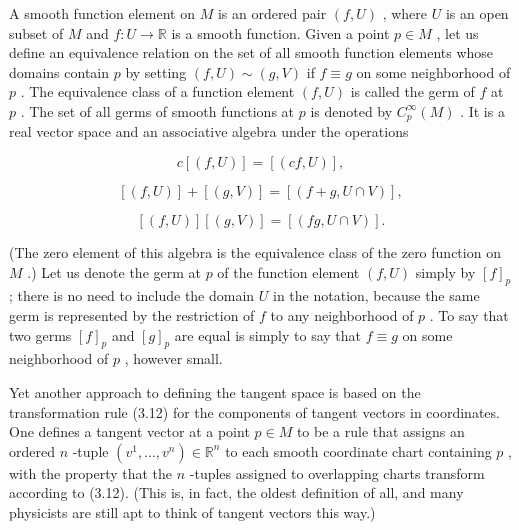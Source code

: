 \begin{definition}
\label{def:3-18-extra-1}
\mathlibok
A smooth function element on $M$ is an ordered pair $\left( {f, U}\right)$ , where $U$ is an open subset of $M$ and $f : U \rightarrow  \mathbb{R}$ is a smooth function. Given a point $p \in  M$ , let us define an equivalence relation on the set of all smooth function elements whose domains contain $p$ by setting $\left( {f, U}\right)  \sim  \left( {g, V}\right)$ if $f \equiv  g$ on some neighborhood of $p$ . The equivalence class of a function element $\left( {f, U}\right)$ is called the germ of $f$ at $p$ . The set of all germs of smooth functions at $p$ is denoted by ${C}_{p}^{\infty }\left( M\right)$ . It is a real vector space and an associative algebra under the operations

\[
c\left\lbrack  \left( {f, U}\right) \right\rbrack   = \left\lbrack  \left( {{cf}, U}\right) \right\rbrack  ,
\]

\[
\left\lbrack  \left( {f, U}\right) \right\rbrack   + \left\lbrack  \left( {g, V}\right) \right\rbrack   = \left\lbrack  \left( {f + g, U \cap  V}\right) \right\rbrack  ,
\]

\[
\left\lbrack  \left( {f, U}\right) \right\rbrack  \left\lbrack  \left( {g, V}\right) \right\rbrack   = \left\lbrack  \left( {{fg}, U \cap  V}\right) \right\rbrack  .
\]

(The zero element of this algebra is the equivalence class of the zero function on $M$ .) Let us denote the germ at $p$ of the function element $\left( {f, U}\right)$ simply by ${\left\lbrack  f\right\rbrack  }_{p}$ ; there is no need to include the domain $U$ in the notation, because the same germ is represented by the restriction of $f$ to any neighborhood of $p$ . To say that two germs ${\left\lbrack  f\right\rbrack  }_{p}$ and ${\left\lbrack  g\right\rbrack  }_{p}$ are equal is simply to say that $f \equiv  g$ on some neighborhood of $p$ , however small.
\end{definition}

\begin{definition}
\label{def:3-18-extra-4}
\leanok
Yet another approach to defining the tangent space is based on the transformation rule (3.12) for the components of tangent vectors in coordinates. One defines a tangent vector at a point $p \in  M$ to be a rule that assigns an ordered $n$ -tuple $\left( {{v}^{1},\ldots ,{v}^{n}}\right)  \in  {\mathbb{R}}^{n}$ to each smooth coordinate chart containing $p$ , with the property that the $n$ -tuples assigned to overlapping charts transform according to (3.12). (This is, in fact, the oldest definition of all, and many physicists are still apt to think of tangent vectors this way.)
\end{definition}


